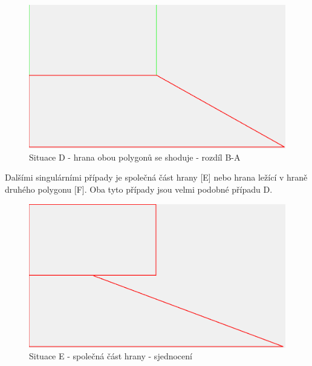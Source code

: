 \documentclass[a4paper,11pt,twoside]{article}
\begin{document}
\vspace{0.2cm}
\begin{figure}[hbt!] 
\begin{center}
\includegraphics[width=15cm]{pictures/D_diffBA.png} 
\caption[Situace D - hrana obou polygonů se shoduje - rozdíl B-A]{Situace D - hrana obou polygonů se shoduje - rozdíl B-A}
\label{fig:D_diffBA}
\end{center}
\end{figure}

Dalšími singulárními případy je společná část hrany [E] nebo hrana ležící v hraně druhého polygonu [F]. Oba tyto případy jsou velmi podobné případu D.

\vspace{0.2cm}
\begin{figure}[hbt!] 
\begin{center}
\includegraphics[width=15cm]{pictures/E_union.png} 
\caption[Situace E - společná část hrany - sjednocení]{Situace E - společná část hrany - sjednocení}
\label{fig:E_union}
\end{center}
\end{figure}
\end{document}
